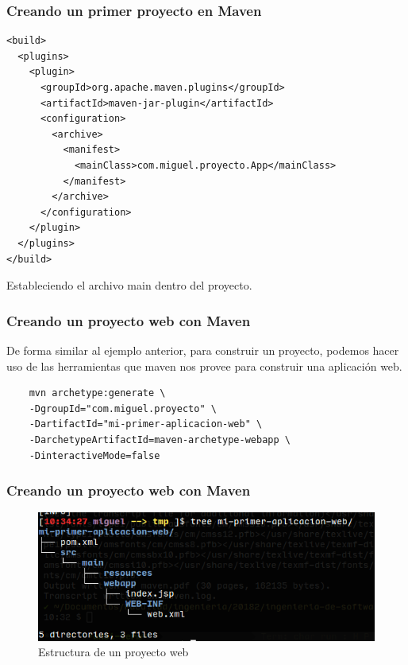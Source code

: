 \documentclass{beamer}
\begin{document}
\begin{frame}[fragile]
  \frametitle{Creando un primer proyecto en Maven}

  \begin{verbatim}
<build>
  <plugins>
	<plugin>
	  <groupId>org.apache.maven.plugins</groupId>
	  <artifactId>maven-jar-plugin</artifactId>
	  <configuration>
		<archive>
		  <manifest>
			<mainClass>com.miguel.proyecto.App</mainClass>
		  </manifest>
		</archive>
	  </configuration>
	</plugin>
  </plugins>
</build>
\end{verbatim}

Estableciendo el archivo main dentro del proyecto.


\end{frame}

\begin{frame}[fragile]
  \frametitle{Creando un proyecto web con Maven}
  De forma similar al ejemplo anterior, para construir un proyecto, podemos hacer
  uso de las herramientas que maven nos provee para construir una
  aplicación web.

  \begin{verbatim}
    mvn archetype:generate \
    -DgroupId="com.miguel.proyecto" \
    -DartifactId="mi-primer-aplicacion-web" \
    -DarchetypeArtifactId=maven-archetype-webapp \
    -DinteractiveMode=false
  \end{verbatim}
\end{frame}

\begin{frame}[fragile]
  \frametitle{Creando un proyecto web con Maven}
  \begin{figure}[ht]
    \centering
    \includegraphics[scale=0.5]{figures/mvn3.png}
    \caption{\label{fig:maven3} Estructura de un proyecto web}
  \end{figure}

\end{frame}
\end{document}
